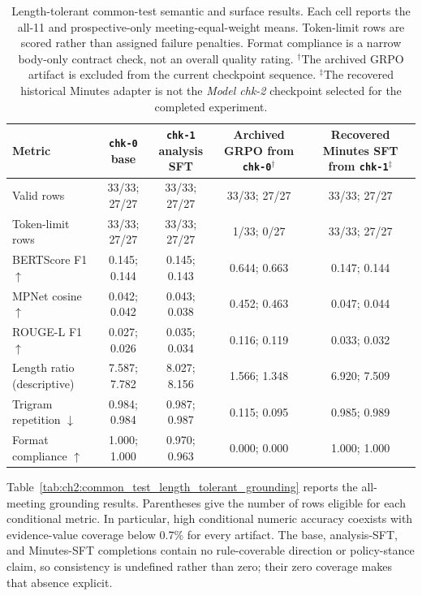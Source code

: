 \begin{table}[htbp]
    \centering
    \scriptsize
    \begin{tabular}{p{} c c c c}
        \toprule
        \textbf{Metric} &
        \makecell[c]{\texttt{chk-0}\\base} &
        \makecell[c]{\texttt{chk-1}\\analysis SFT} &
        \makecell[c]{Archived GRPO\\from \texttt{chk-0}$^{\dagger}$} &
        \makecell[c]{Recovered Minutes SFT\\from \texttt{chk-1}$^{\ddagger}$} \\
        \midrule
        Valid rows & 33/33; 27/27 & 33/33; 27/27 & 33/33; 27/27 & 33/33; 27/27 \\
        Token-limit rows & 33/33; 27/27 & 33/33; 27/27 & 1/33; 0/27 & 33/33; 27/27 \\
        BERTScore F1 $\uparrow$ & 0.145; 0.144 & 0.145; 0.143 & 0.644; 0.663 & 0.147; 0.144 \\
        MPNet cosine $\uparrow$ & 0.042; 0.042 & 0.043; 0.038 & 0.452; 0.463 & 0.047; 0.044 \\
        ROUGE-L F1 $\uparrow$ & 0.027; 0.026 & 0.035; 0.034 & 0.116; 0.119 & 0.033; 0.032 \\
        Length ratio (descriptive) & 7.587; 7.782 & 8.027; 8.156 & 1.566; 1.348 & 6.920; 7.509 \\
        Trigram repetition $\downarrow$ & 0.984; 0.984 & 0.987; 0.987 & 0.115; 0.095 & 0.985; 0.989 \\
        Format compliance $\uparrow$ & 1.000; 1.000 & 0.970; 0.963 & 0.000; 0.000 & 1.000; 1.000 \\
        \bottomrule
    \end{tabular}
    \caption{Length-tolerant common-test semantic and surface results. Each
    cell reports the all-11 and prospective-only meeting-equal-weight means.
    Token-limit rows are scored rather than assigned failure penalties.
    Format compliance is a narrow body-only contract check, not an overall
    quality rating. $^{\dagger}$The archived GRPO artifact is excluded from
    the current checkpoint sequence. $^{\ddagger}$The recovered historical
    Minutes adapter is not the \textit{Model chk-2} checkpoint selected for the
    completed experiment.}
    \label{tab:ch2:common_test_length_tolerant_quality}
\end{table}

Table~\ref{tab:ch2:common_test_length_tolerant_grounding} reports the
all-meeting grounding results.  Parentheses give the number of rows eligible
for each conditional metric.  In particular, high conditional numeric
accuracy coexists with evidence-value coverage below 0.7\% for every artifact.
The base, analysis-SFT, and Minutes-SFT completions contain no rule-coverable
direction or policy-stance claim, so consistency is undefined rather than
zero; their zero coverage makes that absence explicit.

